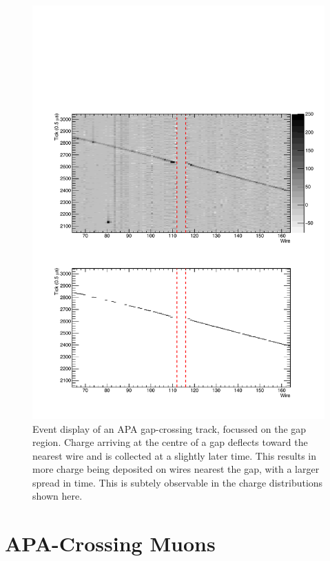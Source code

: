 \begin{figure}
  \centering
  \includegraphics[width=12cm]{evd_gap.pdf}
  \caption[Event display of an APA gap-crossing track, focussed on the gap region.]{Event display of an APA gap-crossing track, focussed on the gap region.  Charge arriving at the centre of a gap deflects toward the nearest wire and is collected at a slightly later time.  This results in more charge being deposited on wires nearest the gap, with a larger spread in time.  This is subtely observable in the charge distributions shown here.}
  \label{fig:evd_gap}
\end{figure}

\section{APA-Crossing Muons}\label{sec:APACrossing}

